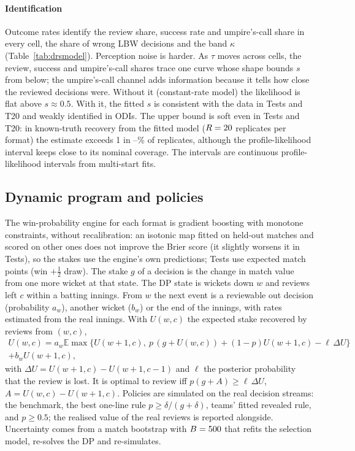 \documentclass[aoas]{imsart}
\theoremstyle{plain}
\theoremstyle{definition}
\newcommand{\E}{\mathbb{E}}
\begin{document}
\paragraph{Identification} Outcome rates identify the review share, success rate and umpire's-call share in every
cell, the share of wrong LBW decisions and the band $\kappa$ (Table~\ref{tab:drsmodel}). Perception noise is harder.
As $\tau$ moves across cells, the review, success and umpire's-call shares trace one curve whose shape bounds $s$ from
below; the umpire's-call channel adds information because it tells how close the reviewed decisions were. Without it
(constant-rate model) the likelihood is flat above $s\approx0.5$. With it, the fitted $s$ is consistent with the data
in Tests and T20 and weakly identified in ODIs. The upper bound is soft even in Tests and T20: in known-truth recovery
from the fitted model ($R=20$ replicates per format) the estimate exceeds 1 in \SDRSOverOneLo--\SDRSOverOneHi\%
of replicates, although the profile-likelihood interval keeps close to its nominal coverage. The intervals are
continuous profile-likelihood intervals from multi-start fits.

\begin{table}[!htbp]
\caption{DRS selection model, batting side, and known-truth recovery of $s$.}\label{tab:drsmodel}
\centering\small

\end{table}

\subsection{Dynamic program and policies}
The win-probability engine for each format is gradient boosting with monotone constraints, without recalibration: an isotonic map fitted on held-out matches and scored on other ones does not improve the Brier score
(it slightly worsens it in Tests), so the stakes use the engine's own predictions; Tests use expected match points (win $+\tfrac12$ draw). The stake $g$ of a decision
is the change in match value from one more wicket at that state. The DP state is wickets down $w$ and reviews left $c$
within a batting innings. From $w$ the next event is a reviewable out decision (probability $a_w$), another wicket
($b_w$) or the end of the innings, with rates estimated from the real innings. With $U(w,c)$ the expected stake
recovered by reviews from $(w,c)$,
\begin{multline*}
U(w,c)=a_w\E\max\bigl\{U(w+1,c),\ p\,(g+U(w,c))+(1-p)U(w+1,c)-\ell\,\Delta U\bigr\}\\+b_wU(w+1,c),
\end{multline*}
with $\Delta U=U(w+1,c)-U(w+1,c-1)$ and $\ell$ the posterior probability that the review is lost. It is optimal to
review iff $p(g+A)\ge\ell\,\Delta U$, $A=U(w,c)-U(w+1,c)$. Policies are simulated on the real decision streams: the
benchmark, the best one-line rule $p\ge\delta/(g+\delta)$, teams' fitted revealed rule, and $p\ge0.5$; the realised value
of the real reviews is reported alongside. Uncertainty comes from a match bootstrap with $B=500$ that refits the
selection model, re-solves the DP and re-simulates.
\end{document}
